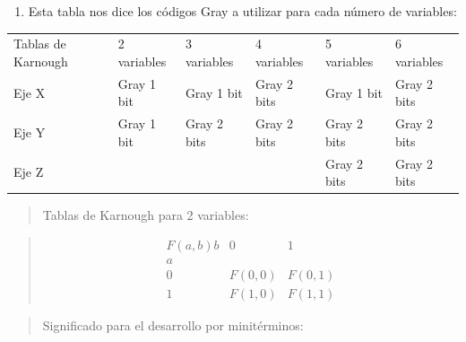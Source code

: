 \documentclass[
]{article}
\newcounter{none} %
\providecommand{\tightlist}{%
  \setlength{\itemsep}{0pt}\setlength{\parskip}{0pt}}
\begin{document}
\begin{enumerate}
\begin{enumerate}
\begin{enumerate}
\begin{enumerate}
        \begin{enumerate}
        \def\labelenumv{\arabic{enumv}.}
        \tightlist
        \item
          \begin{enumerate}
          \def\labelenumvi{\arabic{enumvi}.}
          \tightlist
          \item
            Comenzaremos por ver los métodos de Tablas de Karnough. Para
            éstas utilizamos códigos Gray de los bits necesarios.
          \end{enumerate}
        \end{enumerate}
      \end{enumerate}
    \end{enumerate}
  \end{enumerate}
\item
  Esta tabla nos dice los códigos Gray a utilizar para cada número de
  variables:
\end{enumerate}

{\def\LTcaptype{none} %
\begin{longtable}[]{@{}llllll@{}}
\toprule\noalign{}
\endhead
\bottomrule\noalign{}
\endlastfoot
Tablas de Karnough & 2 variables & 3 variables & 4 variables & 5
variables & 6 variables \\
Eje X & Gray 1 bit & Gray 1 bit & Gray 2 bits & Gray 1 bit & Gray 2
bits \\
Eje Y & Gray 1 bit & Gray 2 bits & Gray 2 bits & Gray 2 bits & Gray 2
bits \\
Eje Z & & & & Gray 2 bits & Gray 2 bits \\
\end{longtable}
}

\begin{quote}
Tablas de Karnough para 2 variables:
\end{quote}

\begin{quote}
\[\begin{matrix}
{F{({a,b})}b} & 0 & 1 \\
a & & \\
0 & {F{(0,0)}} & {F{(0,1)}} \\
1 & {F{(1,0)}} & {F{(1,1)}}
\end{matrix}\]
\end{quote}

\begin{quote}
Significado para el desarrollo por minitérminos:
\end{quote}
\end{document}
